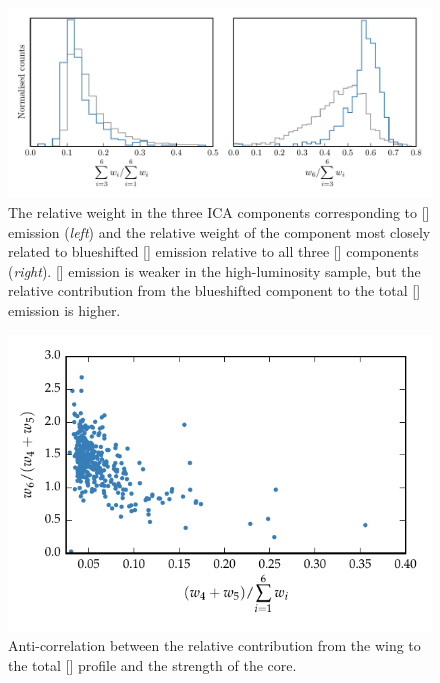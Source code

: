 \begin{figure}
    \centering
    \includegraphics[width=\textwidth]{figures/chapter04/mfica_oiii_weight.pdf} 
    \caption{The relative weight in the three \ac{ICA} components corresponding to [] emission ({\em left}) and the relative weight of the component most closely related to blueshifted [] emission relative to all three [] components ({\em right}). [] emission is weaker in the high-luminosity sample, but the relative contribution from the blueshifted component to the total [] emission is higher.}     
    \label{fig:mfica_oiii_weight}
\end{figure}

\begin{figure}
    \centering
    \includegraphics[width=\columnwidth]{figures/chapter04/oiii_core_strength_blueshift.pdf} 
    \caption{Anti-correlation between the relative contribution from the wing to the total [] profile and the strength of the core.}     
    \label{fig:oiii_core_strength_blueshift}
\end{figure}

